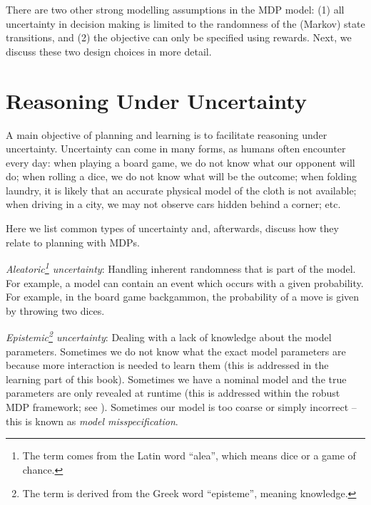 There are two other strong modelling assumptions in the MDP model:  (1) all uncertainty in decision making is limited to the randomness of the (Markov) state transitions, and (2) the objective can only be specified using rewards. Next, we discuss these two design choices in more detail.


\section{Reasoning Under Uncertainty}

A main objective of planning and learning is to facilitate reasoning under uncertainty. Uncertainty can come in many forms, as humans often encounter every day: when playing a board game, we do not know what our opponent will do; when rolling a dice, we do not know what will be the outcome; when folding laundry, it is likely that an accurate physical model of the cloth is not available; when driving in a city, we may not observe cars hidden behind a corner; etc. 




Here we list common types of uncertainty and, afterwards, discuss how they relate to planning with MDPs. 

    {\em Aleatoric\footnote{The term comes from the Latin word ``alea'', which means dice or a game of chance.} uncertainty}: Handling inherent randomness that is part of the model. For example, a model can contain an event which occurs with a given probability. For example, in the board game backgammon, the probability of a move is given by throwing two dices.
    
    {\em Epistemic\footnote{The term is derived from the Greek word ``episteme'', meaning knowledge.} uncertainty}: Dealing with a lack of knowledge about the model parameters. Sometimes we do not know what the exact model parameters are because more interaction is needed to learn them (this is addressed in the learning part of this book). Sometimes we have a nominal model and the true parameters are only revealed at runtime (this is addressed within the robust MDP framework; see \cite{nilim2005robust}). Sometimes our model is too coarse or simply incorrect -- this is known as {\em model misspecification}.
    
